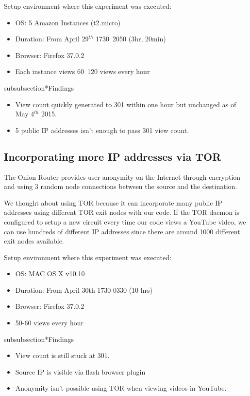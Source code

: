 \documentclass[conference]{IEEEtran}
\begin{document}
Setup environment where this experiment was executed:
\begin{itemize}
  \setlength\itemsep{-0.1em}
  \item OS: 5 Amazon Instances (t2.micro)
  \item Duration: From April 29$^{th}$ 1730~2050 (3hr, 20min)
  \item Browser: Firefox 37.0.2
  \item Each instance views 60~120 views every hour
\end{itemize}

subsubsection*{Findings}
\begin{itemize}
  \setlength\itemsep{-0.1em}
  \item View count quickly generated to 301 within one hour but unchanged as of May 4$^{th}$ 2015.
  \item 5 public IP addresses isn’t enough to pass 301 view count.
\end{itemize}


\subsection{Incorporating more IP addresses via TOR}

The Onion Router provides user anonymity on the Internet through encryption and using 3 random node connections between the source and the destination.

We thought about using TOR because it can incorporate many public IP addresses using different TOR exit nodes with our code. If the TOR daemon is configured to setup a new circuit every time our code views a YouTube video, we can use hundreds of different IP addresses since there are around 1000 different exit nodes available.

Setup environment where this experiment was executed:
\begin{itemize}
  \setlength\itemsep{-0.1em}
  \item OS: MAC OS X v10.10
  \item Duration: From April 30th 1730-0330 (10 hrs)
  \item Browser: Firefox 37.0.2
  \item 50-60 views every hour
\end{itemize}

subsubsection*{Findings}
\begin{itemize}
  \setlength\itemsep{-0.1em}
  \item View count is still stuck at 301.
  \item Source IP is visible via flash browser plugin
  \item Anonymity isn’t possible using TOR when viewing videos in YouTube.
\end{itemize}
\end{document}
